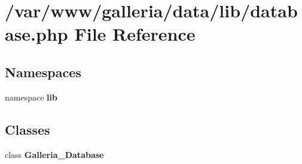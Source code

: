 \section{/var/www/galleria/data/lib/database.php File Reference}
\label{lib_2database_8php}
\subsection*{Namespaces}
\begin{CompactItemize}
\item 
namespace {\bf lib}
\end{CompactItemize}
\subsection*{Classes}
\begin{CompactItemize}
\item 
class {\bf Galleria\_\-Database}
\end{CompactItemize}
